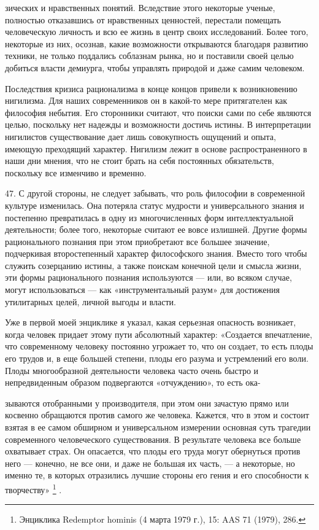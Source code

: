 \documentclass[a5paper,10pt]{article}
\begin{document}
зических и нравственных понятий. Вследствие этого некоторые ученые, полностью
отказавшись от нравственных ценностей, перестали помещать человеческую личность
и всю ее жизнь в центр своих исследований. Более того, некоторые из них,
осознав, какие возможности открываются благодаря развитию техники, не только
поддались соблазнам рынка, но и поставили своей целью добиться власти демиурга,
чтобы управлять природой и даже самим человеком.

Последствия кризиса рационализма в конце концов привели к возникновению
нигилизма. Для наших современников он в какой-то мере притягателен как
философия небытия. Его сторонники считают, что поиски сами по себе являются
целью, поскольку нет надежды и возможности достичь истины. В интерпретации
нигилистов существование дает лишь совокупность ощущений и опыта, имеющую
преходящий характер. Нигилизм лежит в основе распространенного в наши дни
мнения, что не стоит брать на себя постоянных обязательств, поскольку все
изменчиво и временно.

47. С другой стороны, не следует забывать, что роль философии в современной
культуре изменилась. Она потеряла статус мудрости и универсального знания и
постепенно превратилась в одну из многочисленных форм интеллектуальной
деятельности; более того, некоторые считают ее вовсе излишней. Другие формы
рационального познания при этом приобретают все большее значение, подчеркивая
второстепенный характер философского знания. Вместо того чтобы служить
созерцанию истины, а также поискам конечной цели и смысла жизни, эти формы
рационального познания используются — или, во всяком случае, могут
использоваться — как «инструментальный разум» для достижения утилитарных целей,
личной выгоды и власти.

Уже в первой моей энциклике я указал, какая серьезная опасность возникает,
когда человек придает этому пути абсолютный характер: «Создается впечатление,
что современному человеку постоянно угрожает то, что он создает, то есть плоды
его трудов и, в еще большей степени, плоды его разума и устремлений его воли.
Плоды многообразной деятельности человека часто очень быстро и непредвиденным
образом подвергаются «отчуждению», то есть ока-

зываются отобранными у производителя, при этом они зачастую прямо или косвенно
обращаются против самого же человека. Кажется, что в этом и состоит взятая в ее
самом обширном и универсальном измерении основная суть трагедии современного
человеческого существования. В результате человека все больше охватывает страх.
Он опасается, что плоды его труда могут обернуться против него — конечно, не
все они, и даже не большая их часть, — а некоторые, но именно те, в которых
отразились лучшие стороны его гения и его способности к творчеству»
\footnote{Энциклика Redemptor hominis (4 марта 1979 г.), 15: AAS 71 (1979),
286.}  .
\end{document}
